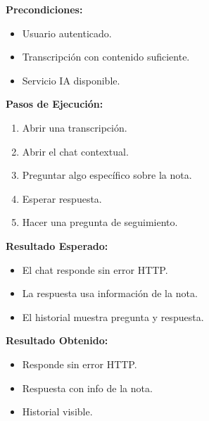 \documentclass[12pt, a4paper]{article}
\newcommand{\prioChip}[2]{%
  \colorbox{#1}{\textcolor{white}{\footnotesize\textbf{#2}}}%
}
\newcommand{\statusChip}[2]{%
  \colorbox{#1}{\textcolor{white}{\footnotesize\textbf{#2}}}%
}
\begin{document}
\newpage

\begin{tcolorbox}[enhanced, breakable, colback=white, colframe=espe-blue,
  boxrule=1pt, arc=5pt,
  title={\textbf{CP-10} \enspace Chat contextual sobre una nota \hfill \prioChip{media}{Media} \enspace \statusChip{paso-green}{PASO}},
  fonttitle=\color{white},
  attach boxed title to top left={yshift=-2mm,xshift=4mm},
  boxed title style={colback=espe-blue,arc=3pt}]
\begin{minipage}[t]{0.48\linewidth}
\textbf{Precondiciones:}
\begin{itemize}[noitemsep,topsep=2pt]
  \item Usuario autenticado.
  \item Transcripci\'on con contenido suficiente.
  \item Servicio IA disponible.
\end{itemize}
\textbf{Pasos de Ejecuci\'on:}
\begin{enumerate}[noitemsep,topsep=2pt]
  \item Abrir una transcripci\'on.
  \item Abrir el chat contextual.
  \item Preguntar algo espec\'ifico sobre la nota.
  \item Esperar respuesta.
  \item Hacer una pregunta de seguimiento.
\end{enumerate}
\end{minipage}\hfill
\begin{minipage}[t]{0.48\linewidth}
\textbf{Resultado Esperado:}
\begin{itemize}[noitemsep,topsep=2pt]
  \item El chat responde sin error HTTP.
  \item La respuesta usa informaci\'on de la nota.
  \item El historial muestra pregunta y respuesta.
\end{itemize}
\vspace{4pt}
\textbf{Resultado Obtenido:}
\begin{itemize}[noitemsep,topsep=2pt]
  \item[$\checkmark$] Responde sin error HTTP.
  \item[$\checkmark$] Respuesta con info de la nota.
  \item[$\checkmark$] Historial visible.
\end{itemize}
\end{minipage}
\end{tcolorbox}
\end{document}
